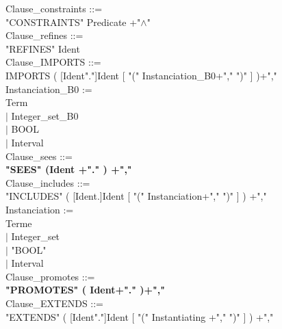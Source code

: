\documentclass[12pt,a4paper,draft]{article}
\begin{document}
\footnotesize{
\begin{sloppypar}

\noindent Clause\_constraints ::= \\
\hspace*{0.20in}  "CONSTRAINTS" Predicate +"$\land$"\\
Clause\_refines ::=\\ 
\hspace*{0.20in}  "REFINES" Ident \\
Clause\_IMPORTS ::= \\
\hspace*{0.20in} IMPORTS ( [Ident"."]Ident  [ "(" Instanciation\_B0+"," ")" ] )+","\\
Instanciation\_B0 := \\
\hspace*{0.20in}    Term\\
\hspace*{0.20in} $|$  Integer\_set\_B0\\
\hspace*{0.20in} $|$  BOOL\\
\hspace*{0.20in} $|$  Interval\\
Clause\_sees ::= \\
\hspace*{0.20in}  \textbf{"SEES" (Ident +"." ) +","}\\
Clause\_includes ::= \\
\hspace*{0.20in}  "INCLUDES" ( [Ident.]Ident  [ "(" Instanciation+","  ")" ] ) +","\\
Instanciation := \\
\hspace*{0.20in}    Terme\\
\hspace*{0.20in} $|$  Integer\_set\\
\hspace*{0.20in} $|$ "BOOL"\\
\hspace*{0.20in} $|$  Interval \\
Clause\_promotes ::= \\
\hspace*{0.20in}   \textbf{"PROMOTES" ( Ident+"." )+","}\\
\noindent Clause\_EXTENDS ::= \\
\hspace*{0.20in}  "EXTENDS" ( [Ident"."]Ident  [ "(" Instantiating +","  ")" ] ) +","\\

\end{sloppypar}}
\end{document}
